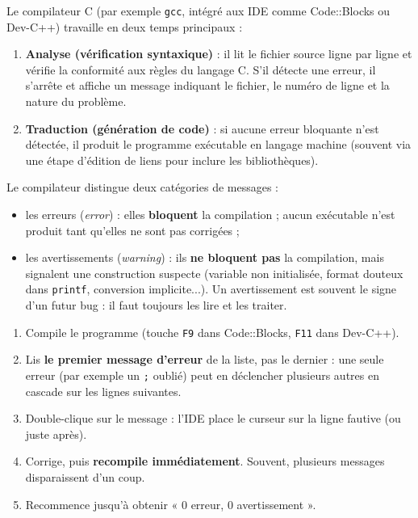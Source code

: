 \documentclass[11pt]{article}
\newcommand{\cle}[1]{{\popxbold\color{popdark}#1}}
\begin{document}
Le compilateur C (par exemple \texttt{gcc}, intégré aux IDE comme Code::Blocks ou Dev-C++) travaille en deux temps principaux :

\begin{enumerate}
  \item \textbf{Analyse (vérification syntaxique)} : il lit le fichier source ligne par ligne et vérifie la conformité aux règles du langage C. S'il détecte une erreur, il s'arrête et affiche un message indiquant le fichier, le numéro de ligne et la nature du problème.
  \item \textbf{Traduction (génération de code)} : si aucune erreur bloquante n'est détectée, il produit le programme exécutable en langage machine (souvent via une étape d'édition de liens pour inclure les bibliothèques).
\end{enumerate}

\begin{propriete}
Le compilateur distingue deux catégories de messages :
\begin{itemize}
  \item les \cle{erreurs} (\emph{error}) : elles \textbf{bloquent} la compilation ; aucun exécutable n'est produit tant qu'elles ne sont pas corrigées ;
  \item les \cle{avertissements} (\emph{warning}) : ils \textbf{ne bloquent pas} la compilation, mais signalent une construction suspecte (variable non initialisée, format douteux dans \texttt{printf}, conversion implicite...). Un avertissement est souvent le signe d'un futur bug : il faut toujours les lire et les traiter.
\end{itemize}
\end{propriete}

\begin{methode}
\begin{enumerate}
  \item Compile le programme (touche \texttt{F9} dans Code::Blocks, \texttt{F11} dans Dev-C++).
  \item Lis \textbf{le premier message d'erreur} de la liste, pas le dernier : une seule erreur (par exemple un \texttt{;} oublié) peut en déclencher plusieurs autres en cascade sur les lignes suivantes.
  \item Double-clique sur le message : l'IDE place le curseur sur la ligne fautive (ou juste après).
  \item Corrige, puis \textbf{recompile immédiatement}. Souvent, plusieurs messages disparaissent d'un coup.
  \item Recommence jusqu'à obtenir « 0 erreur, 0 avertissement ».
\end{enumerate}
\end{methode}
\end{document}
